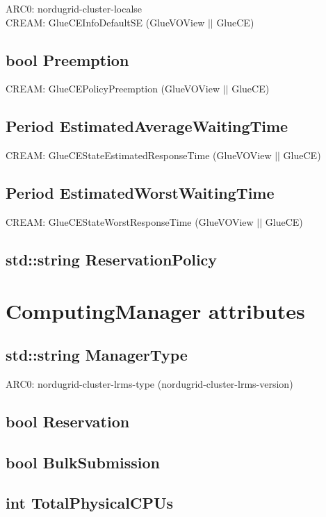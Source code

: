 \documentclass{book}
\begin{document}
ARC0: nordugrid-cluster-localse \\
CREAM: GlueCEInfoDefaultSE (GlueVOView $||$ GlueCE)

\subsection*{bool Preemption}

CREAM: GlueCEPolicyPreemption (GlueVOView $||$ GlueCE)

\subsection*{Period EstimatedAverageWaitingTime}

CREAM: GlueCEStateEstimatedResponseTime (GlueVOView $||$ GlueCE)

\subsection*{Period EstimatedWorstWaitingTime}

CREAM: GlueCEStateWorstResponseTime (GlueVOView $||$ GlueCE)

\subsection*{std::string ReservationPolicy}

\section{ComputingManager attributes}

\subsection*{std::string ManagerType}

ARC0: nordugrid-cluster-lrms-type (nordugrid-cluster-lrms-version)

\subsection*{bool Reservation}
\subsection*{bool BulkSubmission}
\subsection*{int TotalPhysicalCPUs}
\end{document}

